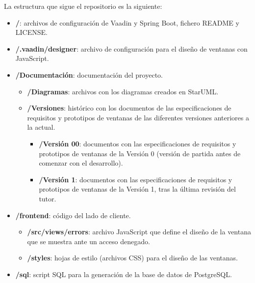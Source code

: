 La estructura que sigue el repositorio es la siguiente:
\begin{itemize}
	\item \textbf{/}: archivos de configuración de Vaadin y Spring Boot, fichero README y LICENSE.
	
	\item \textbf{/.vaadin/designer}: archivo de configuración para el diseño de ventanas con JavaScript.
	
	\item \textbf{/Documentación}: documentación del proyecto.
	\begin{itemize}
	\tightlist
    	\item \textbf{/Diagramas}: archivos con los diagramas creados en StarUML.
    	
    	\item \textbf{/Versiones}: histórico con los documentos de las especificaciones de requisitos y prototipos de ventanas de las diferentes versiones anteriores a la actual.
    	
    	\begin{itemize}
    	\tightlist
        	\item \textbf{/Versión 00}: documentos con las especificaciones de requisitos y prototipos de ventanas de la Versión 0 (versión de partida antes de comenzar con el desarrollo).
        	
        	\item \textbf{/Versión 1}: documentos con las especificaciones de requisitos y prototipos de ventanas de la Versión 1, tras la última revisión del tutor. 
        \end{itemize}
    \end{itemize}
    
    \item \textbf{/frontend}: código del lado de cliente.
        \begin{itemize}
    	\tightlist
        	\item \textbf{/src/views/errors}: archivo JavaScript que define el diseño de la ventana que se muestra ante un acceso denegado.
        	
        	\item \textbf{/styles}: hojas de estilo (archivos CSS) para el diseño de las ventanas.
        \end{itemize}
        
    \item \textbf{/sql}: script SQL para la generación de la base de datos de PostgreSQL.
    

\end{itemize}

